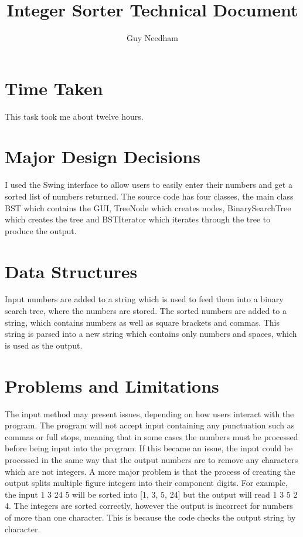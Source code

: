 \documentclass[11pt]{article}
\begin{document}
\title{Integer Sorter Technical Document}
\author{Guy Needham}
\maketitle

\section{Time Taken}
This task took me about twelve hours.

\section{Major Design Decisions}
I used the Swing interface to allow users to easily enter their numbers and get a sorted list of numbers returned.
The source code has four classes, the main class BST which contains the GUI, TreeNode which creates nodes, BinarySearchTree which creates the tree and BSTIterator which iterates through the tree to produce the output.

\section{Data Structures}
Input numbers are added to a string which is used to feed them into a binary search tree, where the numbers are stored. The sorted numbers are added to a string, which contains numbers as well as square brackets and commas. This string is parsed into a new string which contains only numbers and spaces, which is used as the output.

\section{Problems and Limitations}
The input method may present issues, depending on how users interact with the program. The program will not accept input containing any punctuation such as commas or full stops, meaning that in some cases the numbers must be processed before being input into the program. If this became an issue, the input could be processed in the same way that the output numbers are to remove any characters which are not integers. A more major problem is that the process of creating the output splits multiple figure integers into their component digits. For example, the input 1 3 24 5 will be sorted into [1, 3, 5, 24] but the output will read 1 3 5 2 4. The integers are sorted correctly, however the output is incorrect for numbers of more than one character. This is because the code checks the output string by character.
\end{document}
